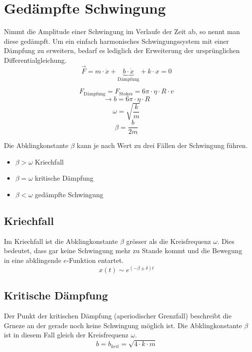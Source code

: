 \section{Gedämpfte Schwingung}
Nimmt die Amplitude einer Schwingung im Verlaufe der Zeit ab, so nennt 
man diese gedämpft. Um ein einfach harmonisches Schwingungssystem mit 
einer Dämpfung zu erweitern, bedarf es lediglich der Erweiterung der
ursprünglichen Differentialgleichung.
\[ \boxed{\vec{F} 
	= m \cdot \ddot{x} + \underbrace{
		b \cdot \dot{x}}_{\text{Dämpfung}} 
	+ k \cdot x = 0
} \]



\[ \boxed{F_{\text{Dämpfung}} = F_{\text{Stokes}} 
= 6 \pi \cdot \eta \cdot R \cdot v} \]
\[ \boxed{\rightarrow b = 6 \pi \cdot \eta \cdot R} \]
\[ \boxed{\omega = \sqrt{\frac{k}{m}}} \]
\[ \boxed{\beta = \frac{b}{2 m}} \]

Die Abklingkonstante $\beta$ kann je nach Wert zu drei Fällen der
Schwingung führen.
\begin{itemize}
	\item $\beta > \omega$ \hfill{} Kriechfall
	\item $\beta = \omega$ \hfill{} kritische Dämpfung
	\item $\beta < \omega$ \hfill{} gedämpfte Schwingung
\end{itemize}

\subsection{Kriechfall}
Im Kriechfall ist die Abklingkonstante $\beta$ grösser als die 
Kreisfrequenz $\omega$. Dies bedeutet, dass gar keine Schwingung
mehr zu Stande kommt und die Bewegung in eine abklingende 
$e$-Funktion entartet.
\[ \boxed{x(t) \sim e^{(-\beta \pm \delta)t}} \]

\subsection{Kritische Dämpfung}
Der Punkt der kritischen Dämpfung (aperiodischer Grenzfall) beschreibt
die Grneze an der gerade noch keine Schwingung möglich ist. Die 
Abklingkonstante $\beta$ ist in diesem Fall gleich der Kreisfrequenz
$\omega$. 
\[ \boxed{b = b_{krit} = \sqrt{4 \cdot k \cdot m}} \]

